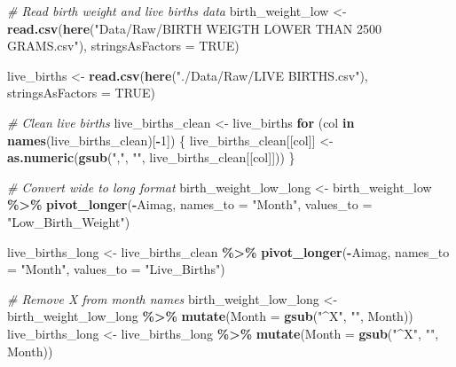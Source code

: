 \documentclass[
]{article}
\newenvironment{Shaded}{\begin{snugshade}}{\end{snugshade}}
\newcommand{\AttributeTok}[1]{\textcolor[rgb]{0.13,0.29,0.53}{#1}}
\newcommand{\CommentTok}[1]{\textcolor[rgb]{0.56,0.35,0.01}{\textit{#1}}}
\newcommand{\ConstantTok}[1]{\textcolor[rgb]{0.56,0.35,0.01}{#1}}
\newcommand{\ControlFlowTok}[1]{\textcolor[rgb]{0.13,0.29,0.53}{\textbf{#1}}}
\newcommand{\DecValTok}[1]{\textcolor[rgb]{0.00,0.00,0.81}{#1}}
\newcommand{\FunctionTok}[1]{\textcolor[rgb]{0.13,0.29,0.53}{\textbf{#1}}}
\newcommand{\NormalTok}[1]{#1}
\newcommand{\OtherTok}[1]{\textcolor[rgb]{0.56,0.35,0.01}{#1}}
\newcommand{\SpecialCharTok}[1]{\textcolor[rgb]{0.81,0.36,0.00}{\textbf{#1}}}
\newcommand{\StringTok}[1]{\textcolor[rgb]{0.31,0.60,0.02}{#1}}
\begin{document}
\begin{Shaded}
\begin{Highlighting}[]
\CommentTok{\# Read birth weight and live births data}
\NormalTok{birth\_weight\_low }\OtherTok{\textless{}{-}} \FunctionTok{read.csv}\NormalTok{(}\FunctionTok{here}\NormalTok{(}\StringTok{"Data/Raw/BIRTH WEIGTH LOWER THAN 2500 GRAMS.csv"}\NormalTok{), }\AttributeTok{stringsAsFactors =} \ConstantTok{TRUE}\NormalTok{)}

\NormalTok{live\_births }\OtherTok{\textless{}{-}} \FunctionTok{read.csv}\NormalTok{(}\FunctionTok{here}\NormalTok{(}\StringTok{"./Data/Raw/LIVE BIRTHS.csv"}\NormalTok{), }\AttributeTok{stringsAsFactors =} \ConstantTok{TRUE}\NormalTok{)}

\CommentTok{\# Clean live births}
\NormalTok{live\_births\_clean }\OtherTok{\textless{}{-}}\NormalTok{ live\_births}
\ControlFlowTok{for}\NormalTok{ (col }\ControlFlowTok{in} \FunctionTok{names}\NormalTok{(live\_births\_clean)[}\SpecialCharTok{{-}}\DecValTok{1}\NormalTok{]) \{}
\NormalTok{  live\_births\_clean[[col]] }\OtherTok{\textless{}{-}} \FunctionTok{as.numeric}\NormalTok{(}\FunctionTok{gsub}\NormalTok{(}\StringTok{","}\NormalTok{, }\StringTok{""}\NormalTok{, live\_births\_clean[[col]]))}
\NormalTok{\}}

\CommentTok{\# Convert wide to long format}
\NormalTok{birth\_weight\_low\_long }\OtherTok{\textless{}{-}}\NormalTok{ birth\_weight\_low }\SpecialCharTok{\%\textgreater{}\%} 
  \FunctionTok{pivot\_longer}\NormalTok{(}\SpecialCharTok{{-}}\NormalTok{Aimag, }\AttributeTok{names\_to =} \StringTok{"Month"}\NormalTok{, }\AttributeTok{values\_to =} \StringTok{"Low\_Birth\_Weight"}\NormalTok{)}

\NormalTok{live\_births\_long }\OtherTok{\textless{}{-}}\NormalTok{ live\_births\_clean }\SpecialCharTok{\%\textgreater{}\%} 
  \FunctionTok{pivot\_longer}\NormalTok{(}\SpecialCharTok{{-}}\NormalTok{Aimag, }\AttributeTok{names\_to =} \StringTok{"Month"}\NormalTok{, }\AttributeTok{values\_to =} \StringTok{"Live\_Births"}\NormalTok{)}

\CommentTok{\# Remove \textquotesingle{}X\textquotesingle{} from month names}
\NormalTok{birth\_weight\_low\_long }\OtherTok{\textless{}{-}}\NormalTok{ birth\_weight\_low\_long }\SpecialCharTok{\%\textgreater{}\%} \FunctionTok{mutate}\NormalTok{(}\AttributeTok{Month =} \FunctionTok{gsub}\NormalTok{(}\StringTok{"\^{}X"}\NormalTok{, }\StringTok{""}\NormalTok{, Month))}
\NormalTok{live\_births\_long       }\OtherTok{\textless{}{-}}\NormalTok{ live\_births\_long }\SpecialCharTok{\%\textgreater{}\%} \FunctionTok{mutate}\NormalTok{(}\AttributeTok{Month =} \FunctionTok{gsub}\NormalTok{(}\StringTok{"\^{}X"}\NormalTok{, }\StringTok{""}\NormalTok{, Month))}


\end{Highlighting}
\end{Shaded}
\end{document}
